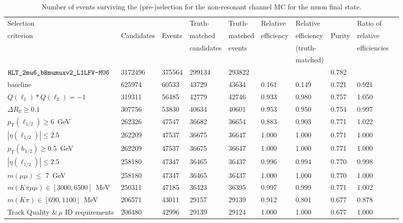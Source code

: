 \begin{table}[ht!]
  \caption{Number of events surviving the (pre-)selection for the non-resonant channel MC for the muon final state.}
  \centering 
  \hspace*{-1.cm}
  \small
    \begin{tabular}{l | l l| l l| l l| l |ll } 
    \hline\hline
    Selection &             &        & Truth- & Truth- & Relative & Relative &  &  Ratio of\\
    criterion & Candidates  & Events & matched & matched & efficiency & efficiency & Purity & relative \\
              &             &        & candidates & events &          & (truth- & & efficiencies\\
              &             &        &   &   &          & matched) & & \\
    	\hline
    $\verb|HLT_2mu6_bBmumuxv2_L1LFV-MU6|$& 3172496 & 375564 & 299134 & 293822 &&& 0.782 &\\
    baseline& 625974 & 60533 & 43729 & 43634 & 0.161 & 0.149 & 0.721 & 0.921\\
    $Q(\ell_{1}) * Q(\ell_{2}) = -1$& 319311 & 56485 & 42779 & 42746 & 0.933 & 0.980 & 0.757 & 1.050\\
    $\Delta R_{ll}\geq  0.1$& 307756 & 53830 & 40634 & 40601 & 0.953 & 0.950 & 0.754 & 0.997\\
    $p_{\mathrm{T}}(\ell_{1/2}) \geq 6$~GeV& 262326 & 47547 & 36682 & 36654 & 0.883 & 0.903 & 0.771 & 1.022\\
    $|\eta(\ell_{1/2})| \leq 2.5$& 262209 & 47537 & 36675 & 36647 & 1.000 & 1.000 & 0.771 & 1.000\\
    $p_{\mathrm{T}}(h_{1/2}) \geq 0.5$~GeV& 262209 & 47537 & 36675 & 36647 & 1.000 & 1.000 & 0.771 & 1.000\\
    $|\eta(\ell_{1/2})| \leq 2.5$& 258180 & 47347 & 36465 & 36437 & 0.996 & 0.994 & 0.770 & 0.998\\
    $m(\mu\mu) \leq$ 7~GeV& 258180 & 47347 & 36465 & 36437 & 1.000 & 1.000 & 0.770 & 1.000\\
    \hline
    $m(K\pi \mu\mu) \in [3000,6500]$~MeV& 250311 & 47185 & 36423 & 36395 & 0.997 & 0.999 & 0.771 & 1.002\\
    $m(K\pi) \in [690,1100]$~MeV& 206571 & 43011 & 29157 & 29139 & 0.912 & 0.801 & 0.677 & 0.878\\
    Track Quality $\&\,\mu$ ID requirements& 206480 & 42996 & 29139 & 29124 & 1.000 & 1.000 & 0.677 & 1.000\\
    \hline

\end{tabular}
\end{table}
